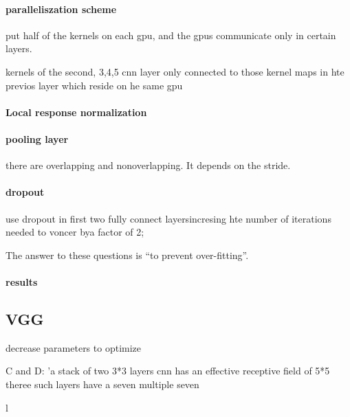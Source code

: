 \documentclass[12pt]{article}
\begin{document}
\paragraph{paralleliszation scheme}
put half of the kernels on each gpu, and the gpus communicate only in certain layers.

kernels of the second, 3,4,5 cnn layer only connected to those kernel maps in  hte previos layer which reside on he same gpu


\paragraph{Local response normalization}

\paragraph{pooling layer}
there are overlapping and nonoverlapping. It depends on the stride.

\paragraph{dropout}
use dropout in first two fully connect layersincresing hte number of iterations needed to voncer bya  factor of 2;

The answer to these questions is “to prevent over-fitting”.

\paragraph{results}


\subsection{VGG}
decrease parameters to optimize

C and D: 'a stack of two 3*3 layers cnn has an effective receptive field of 5*5 theree such layers have a seven multiple seven 

l
\end{document}

